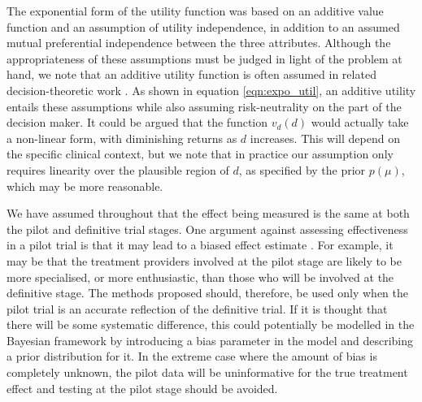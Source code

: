 \documentclass[sagev, Crown]{sagej} %
\begin{document}
The exponential form of the utility function was based on an additive value function and an assumption of utility independence, in addition to an assumed mutual preferential independence between the three attributes. Although the appropriateness of these assumptions must be judged in light of the problem at hand, we note that an additive utility function is often assumed in related decision-theoretic work \cite{Gittins2000a, Willan2005, Kikuchi2009, Hee2012, Pearce2018} . As shown in equation \ref{eqn:expo_util}, an additive utility entails these assumptions while also assuming risk-neutrality on the part of the decision maker. It could be argued that the function $v_d(d)$ would actually take a non-linear form, with diminishing returns as $d$ increases. This will depend on the specific clinical context, but we note that in practice our assumption only requires linearity over the plausible region of $d$, as specified by the prior $p(\mu)$, which may be more reasonable. 

We have assumed throughout that the effect being measured is the same at both the pilot and definitive trial stages. One argument against assessing effectiveness in a pilot trial is that it may lead to a biased effect estimate \cite{Sim2019}. For example, it may be that the treatment providers involved at the pilot stage are likely to be more specialised, or more enthusiastic, than those who will be involved at the definitive stage. The methods proposed should, therefore, be used only when the pilot trial is an accurate reflection of the definitive trial. If it is thought that there will be some systematic difference, this could potentially be modelled in the Bayesian framework by introducing a bias parameter in the model and describing a prior distribution for it. In the extreme case where the amount of bias is completely unknown, the pilot data will be uninformative for the true treatment effect and testing at the pilot stage should be avoided.


\end{document}

